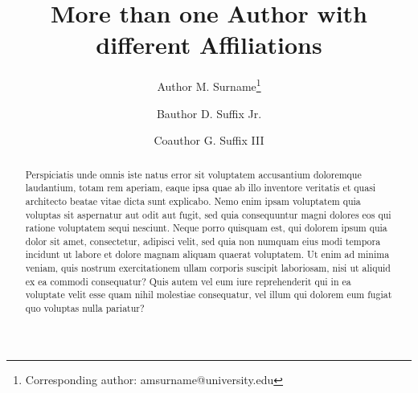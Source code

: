 \documentclass[10pt,a4paper,twocolumn]{article}
\begin{document}
\providecommand{\ShortAuthorList}[0]{A.~M.~Surname, B.~D.~Suffix Jr., C.~G. Suffix III} %
\title{More than one Author with different Affiliations}
\author[1]{Author M. Surname\thanks{Corresponding author: amsurname@university.edu}}
\author[2]{Bauthor D. Suffix Jr.}
\author[2]{Coauthor G. Suffix III}

\date{}

\begin{abstract}
\noindent
Perspiciatis unde omnis iste natus error sit voluptatem accusantium doloremque laudantium, totam rem aperiam, eaque ipsa quae ab illo inventore veritatis et quasi architecto beatae vitae dicta sunt explicabo. Nemo enim ipsam voluptatem quia voluptas sit aspernatur aut odit aut fugit, sed quia consequuntur magni dolores eos qui ratione voluptatem sequi nesciunt. Neque porro quisquam est, qui dolorem ipsum quia dolor sit amet, consectetur, adipisci velit, sed quia non numquam eius modi tempora incidunt ut labore et dolore magnam aliquam quaerat voluptatem. Ut enim ad minima veniam, quis nostrum exercitationem ullam corporis suscipit laboriosam, nisi ut aliquid ex ea commodi consequatur? Quis autem vel eum iure reprehenderit qui in ea voluptate velit esse quam nihil molestiae consequatur, vel illum qui dolorem eum fugiat quo voluptas nulla pariatur?


\DOI{} %
\end{abstract}

\maketitle
\thispagestyle{titlestyle}



\end{document}
